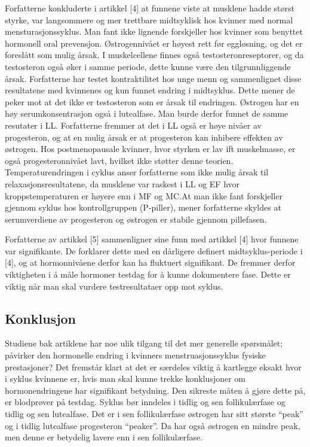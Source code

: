 \documentclass[
  letterpaper,
  DIV=11,
  numbers=noendperiod]{scrreprt}
\begin{document}
Forfatterne konkluderte i artikkel {[}4{]} at funnene viste at musklene
hadde størst styrke, var langsommere og mer trettbare midtsyklisk hos
kvinner med normal mensturasjonssyklus. Man fant ikke lignende
forskjeller hos kvinner som benyttet hormonell oral prevensjon.
Østrogennivået er høyest rett før eggløsning, og det er foreslått som
mulig årsak. I muskelcellene finnes også testosteronreseptorer, og da
testosteron også øker i samme periode, dette kunne være den
tilgrunnliggende årsak. Forfatterne har testet kontraktilitet hos unge
menn og sammenlignet disse resultatene med kvinnenes og kun funnet
endring i midtsyklus. Dette mener de peker mot at det ikke er
testosteron som er årsak til endringen. Østrogen har en høy
serumkonsentrasjon også i lutealfase. Man burde derfor funnet de samme
resutater i LL. Forfatterne fremmer at det i LL også er høye nivåer av
progesteron, og at en mulig årsak er at progesteron kan inhibere
effekten av østrogen. Hos postmenopausale kvinner, hvor styrken er lav
ift muskelmasse, er også progesteronnivået lavt, hvilket ikke støtter
denne teorien. Temperaturendringen i cyklus anser forfatterne som ikke
mulig årsak til relaxasjonsresultatene, da musklene var raskest i LL og
EF hvor kroppstemperaturen er høyere enn i MF og MC.At man ikke fant
forskjeller gjennom syklus hos kontrollgruppen (P-piller), mener
forfatterne skyldes at serumverdiene av progesteron og østrogen er
stabile gjennom pillefasen.

Forfatterne av artikkel {[}5{]} sammenligner sine funn med artikkel
{[}4{]} hvor funnene var signifikante. De forklarer dette med en
dårligere definert midtsyklus-periode i {[}4{]}, og at hormonnivåene
derfor kan ha fluktuert signifikant. De fremmer derfor viktigheten i å
måle hormoner testdag for å kunne dokumentere fase. Dette er viktig når
man skal vurdere testresultataer opp mot syklus.

\hypertarget{konklusjon-1}{%
\subsection{Konklusjon}\label{konklusjon-1}}

Studiene bak artiklene har noe ulik tilgang til det mer generelle
spørsmålet; påvirker den hormonelle endring i kvinners
menstruasjonssyklus fysiske prestasjoner? Det fremstår klart at det er
særdeles viktig å kartlegge eksakt hvor i syklus kvinnene er, hvis man
skal kunne trekke konklusjoner om hormonendringene har signifikant
betydning. Den sikreste måten å gjøre dette på, er blodprøver på
testdag. Syklus bør inndeles i tidlig og sen follikulærfase og tidlig og
sen lutealfase. Det er i sen follikulærfase østrogen har sitt største
``peak'' og i tidlig lutealfase progesteron ``peaker''. Da har også
østrogen en mindre peak, men denne er betydelig lavere enn i sen
follikulærfase.
\end{document}
